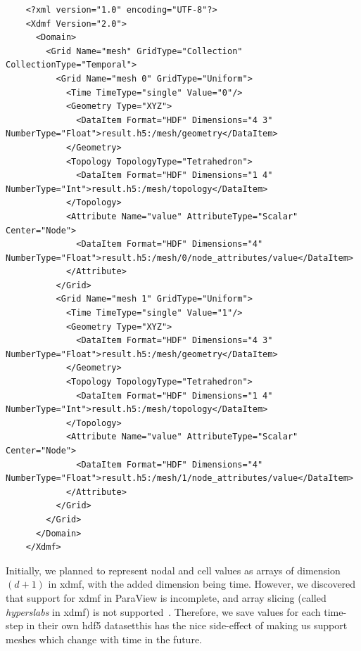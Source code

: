 \documentclass[british]{scrreprt}
\begin{document}
\begin{listing}
    \begin{verbatim}
    <?xml version="1.0" encoding="UTF-8"?>
    <Xdmf Version="2.0">
      <Domain>
        <Grid Name="mesh" GridType="Collection" CollectionType="Temporal">
          <Grid Name="mesh 0" GridType="Uniform">
            <Time TimeType="single" Value="0"/>
            <Geometry Type="XYZ">
              <DataItem Format="HDF" Dimensions="4 3" NumberType="Float">result.h5:/mesh/geometry</DataItem>
            </Geometry>
            <Topology TopologyType="Tetrahedron">
              <DataItem Format="HDF" Dimensions="1 4" NumberType="Int">result.h5:/mesh/topology</DataItem>
            </Topology>
            <Attribute Name="value" AttributeType="Scalar" Center="Node">
              <DataItem Format="HDF" Dimensions="4" NumberType="Float">result.h5:/mesh/0/node_attributes/value</DataItem>
            </Attribute>
          </Grid>
          <Grid Name="mesh 1" GridType="Uniform">
            <Time TimeType="single" Value="1"/>
            <Geometry Type="XYZ">
              <DataItem Format="HDF" Dimensions="4 3" NumberType="Float">result.h5:/mesh/geometry</DataItem>
            </Geometry>
            <Topology TopologyType="Tetrahedron">
              <DataItem Format="HDF" Dimensions="1 4" NumberType="Int">result.h5:/mesh/topology</DataItem>
            </Topology>
            <Attribute Name="value" AttributeType="Scalar" Center="Node">
              <DataItem Format="HDF" Dimensions="4" NumberType="Float">result.h5:/mesh/1/node_attributes/value</DataItem>
            </Attribute>
          </Grid>
        </Grid>
      </Domain>
    </Xdmf>
    \end{verbatim}
    \caption{A simple \gls{xdmf} file with two time-points (lines 3\textendash{}16 and 17\textendash{}28), a mesh consisting of 4 points (lines 7\textendash{}9 and 19\textendash{}21) defining a single tetrahedral cell (lines 10\textendash{}12 and 22\textendash{}24) and scalar nodal values (lines 13\textendash{}15 and 25\textendash{}27). The mesh does not change between the time-steps, as evidenced by the \texttt{<Geometry>} and \texttt{<Topology>} elements referencing the exact same data (\texttt{result.h5:/mesh/geometry} and \texttt{result.h5:/mesh/topology} respectively).}
    \label{lst:xdmf}
\end{listing}

Initially, we planned to represent nodal and cell values as arrays of dimension \( (d + 1) \) in \gls{xdmf}, with the added dimension being time. However, we discovered that support for \gls{xdmf} in ParaView is incomplete, and array slicing (called \textit{hyperslabs} in \gls{xdmf}) is not supported~\cite{xdmfHyperSlabtimesteps2020}. Therefore, we save values for each time-step in their own \gls{hdf5} dataset\textemdash{}this has the nice side-effect of making us support meshes which change with time in the future.
\end{document}
